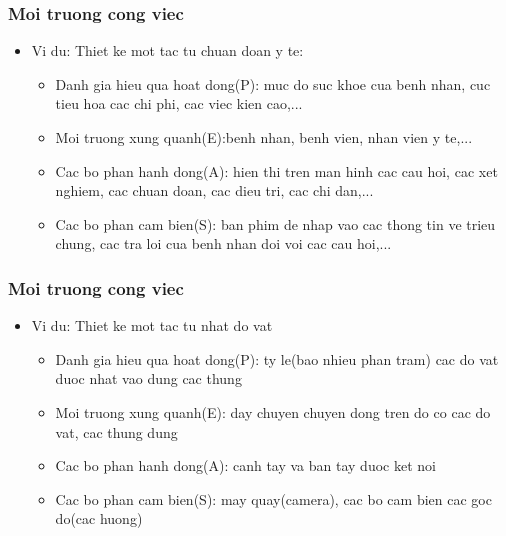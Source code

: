 \documentclass[12pt]{beamer}
\begin{document}
\begin{frame}
\frametitle{Moi truong cong viec}
\begin{itemize}
    \item Vi du: Thiet ke mot tac tu chuan doan y te:
    \begin{itemize}
        \item Danh gia hieu qua hoat dong(P): muc do suc khoe cua benh nhan, cuc tieu hoa cac chi phi, cac viec kien cao,...\\
        \item Moi truong xung quanh(E):benh nhan, benh vien, nhan vien y te,...\\
        \item Cac bo phan hanh dong(A): hien thi tren man hinh cac cau hoi, cac xet nghiem, cac chuan doan, cac dieu tri, cac chi dan,...\\
        \item Cac bo phan cam bien(S): ban phim de nhap vao cac thong tin ve trieu chung, cac tra loi cua benh nhan doi voi cac cau hoi,...\\
    \end{itemize}
\end{itemize}
\end{frame}
\begin{frame}
\frametitle{Moi truong cong viec}
\begin{itemize}
    \item Vi du: Thiet ke mot tac tu nhat do vat
    \begin{itemize}
        \item Danh gia hieu qua hoat dong(P): ty le(bao nhieu phan tram) cac do vat duoc nhat vao dung cac thung\\
        \item Moi truong xung quanh(E): day chuyen chuyen dong tren do co cac do vat, cac thung dung\\
        \item Cac bo phan hanh dong(A): canh tay va ban tay duoc ket noi\\
        \item Cac bo phan cam bien(S): may quay(camera), cac bo cam bien cac goc do(cac huong)\\
    \end{itemize}
\end{itemize}
\end{frame}
\end{document}
